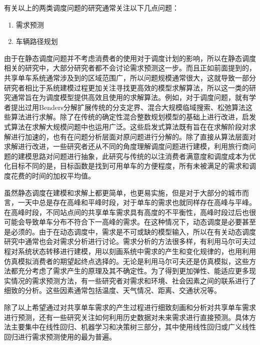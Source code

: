 \documentclass[]{tongjithesis}
\numberwithin{equation}{chapter}
\begin{document}
有关以上的两类调度问题的研究通常关注以下几点问题：
\begin{enumerate}
	\item 需求预测
	\item 车辆路径规划
\end{enumerate}

由于在静态调度问题并不考虑消费者的使用对于调度计划的影响，所以在静态调度相关的研究中，大部分研究者都不会讨论需求预测这一步。而且正如前面提到的，共享单车系统通常涉及到的区域范围广，所以问题规模通常很大，这就导致一部分研究者相比于系统建模过程更加关注寻找更高效的模型求解算法，所以这一类的研究通常旨在为调度模型提供高效且使用的求解算法。例如，对于调度问题，就有学者提出过用Benders分解扩展传统的分支定界\cite{erdougan2015exact}、混合大规模临域搜索\cite{pal2017free}、松弛算法\cite{chemla2013bike}这些算法进行求解。除了在传统的确定性混合整数规划模型的基础上进行改进，启发式算法在求解大规模问题中也运用广泛\cite{ho2014solving,forma20153}。这些启发式算法既有旨在在求解阶段对求解进行加速的，也有在问题分析层面对原问题进行分解的。除了直接从算法层面对求解进行改进，一些研究者还从不同的角度理解调度问题进行建模，利用旅行商问题的建模思路对问题进行抽象\cite{chemla2013bike}，此研究与传统的以注消费者满意度和调度成本为优化目标不同的是，目标函数是找到可用单车的方便程度，所有未被满足的需求和调度花费的时间的加权平均值。

虽然静态调度在建模和求解上都更简单，也更易实施，但是对于大部分的城市而言，一天中总是存在高峰和平峰时段，对于单车的需求也就同样存在高峰与平峰。在高峰时段，不同站点间的共享单车需求具有高度的不平衡性，高峰时段过后也很可能会导致单车分布不符合下一高峰的需求。在这种情况下，动态调度是必要甚至是必须的。由于在动态调度中，需求是不可或缺的模型输入，所以在有关动态调度研究中通常也会对需求分析进行讨论。需求分析的方法很多样，有利用马尔可夫过程对系统状态转移进行建模，用以刻画系统中需求的产生和变化规律的\cite{schuijbroek2017inventory}，也用利用仿真模拟消费者的期望起终点选择的\cite{caggiani2013dynamic}。无论是利用马尔可夫还是仿真模拟，这些方法都充分考虑了需求产生的原理及其不确定性。为了得到更加弹性、能适应更多现实情况的需求预测方法，有一些研究者对需求和环境、社会因素之间的联系进行了细致的分析。这些因素通常包括温度、天气情况、距离、交通状况等\cite{frade2014bicycle,faghih2014land}。

除了以上希望通过对共享单车需求的产生过程进行细致刻画和分析对共享单车需求进行预测，还有一些研究关注如何利用历史数据对未来需求进行直接预测。具体方法主要集中在线性回归、机器学习和决策树三部分，其中使用线性回归或广义线性回归进行需求预测使用的最为普遍。
\end{document}
